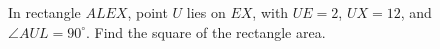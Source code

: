 In rectangle $ALEX$, point $U$ lies on $EX$, with $UE=2$, $UX=12$, and $\angle AUL=90^\circ$. Find the square of the rectangle area.
